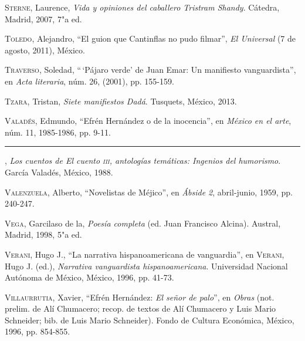 \documentclass[14pt,twoside,final]{extbook} %
\begin{document}
\textsc{Sterne}, Laurence, \emph{Vida y opiniones del caballero Tristram Shandy}. Cátedra, Madrid, 2007, 7"a ed.\label{bib:sterne2007}

\textsc{Toledo}, Alejandro, ``El guion que Cantinflas no pudo filmar'', \emph{El Universal} (7 de agosto, 2011), México.\label{bib:toledo2011}

\textsc{Traverso}, Soledad, ``\,`Pájaro verde' de Juan Emar: Un manifiesto vanguardista'', en \emph{Acta literaria}, núm. 26, (2001), pp. 155-159.\label{bib:traverso2001}

\textsc{Tzara}, Tristan, \emph{Siete manifiestos Dadá}. Tusquets, México, 2013.\label{bib:tzara2013}

\textsc{Valadés}, Edmundo, ``Efrén Hernández o de la inocencia'', en \emph{México en el arte}, núm. 11, 1985-1986, pp. 9-11.\label{bib:valades1985}

\rule{1cm}{0.4pt}, \emph{Los cuentos de \emph{El cuento} \textsc{iii}, antologías temáticas: Ingenios del humorismo}. García Valadés, México, 1988.\label{bib:valades1988}

\textsc{Valenzuela}, Alberto, ``Novelistas de Méjico'', en \emph{Ábside 2}, abril-junio, 1959, pp. 240-247.\label{bib:valenzuela1959}

\textsc{Vega}, Garcilaso de la, \emph{Poesía completa} (ed. Juan Francisco Alcina). Austral, Madrid, 1998, 5"a ed.\label{bib:vega1998}

\textsc{Verani}, Hugo J., ``La narrativa hispanoamericana de vanguardia'', en \textsc{Verani}, Hugo J. (ed.),  \emph{Narrativa vanguardista hispanoamericana}. Universidad Nacional Autónoma de México, México, 1996, pp. 41-73.\label{bib:verani1996}

\textsc{Villaurrutia}, Xavier, ``Efrén Hernández: \emph{El señor de palo}'', en \emph{Obras} (not. prelim. de Alí Chumacero; recop. de textos de Alí Chumacero y Luis Mario Schneider; bib. de Luis Mario Schneider). Fondo de Cultura Económica, México, 1996, pp. 854-855.\label{bib:villaurrutia1996}
\end{document}
